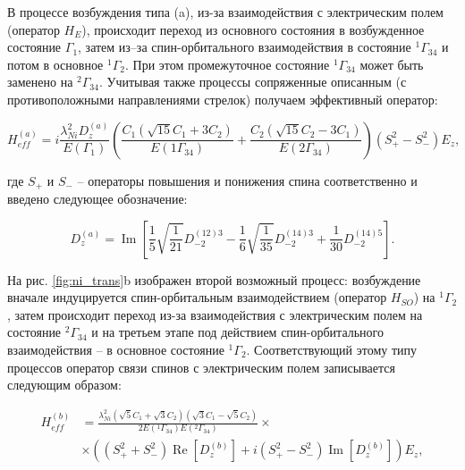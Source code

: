 В процессе возбуждения типа (a), из-за взаимодействия с электрическим полем (оператор $H_{E}$), происходит переход из основного состояния в возбужденное состояние $\Gamma_{1}$, затем из–за спин-орбитального взаимодействия в состояние $^{1}\Gamma_{34}$ и потом в основное $^{1}\Gamma_{2}$. При этом промежуточное состояние  $^{1}\Gamma_{34}$ может быть заменено на $^{2}\Gamma_{34}$. Учитывая также процессы сопряженные описанным (с противоположными направлениями стрелок) получаем эффективный оператор:

\begin{equation}
	\label{eq:NiHeffA}
	H_{eff}^{(a)}=i \frac{\lambda_{Ni}^{2} D_{z}^{(a)}}{E\left(\Gamma_{1}\right)}\left(\frac{C_{1}\left(\sqrt{15} C_{1}+3 C_{2}\right)}{E\left(1 \Gamma_{34}\right)}+\frac{C_{2}\left(\sqrt{15} C_{2}-3 C_{1}\right)}{E\left(2 \Gamma_{34}\right)}\right)\left(S_{+}^{2}-S_{-}^{2}\right) E_{z},
\end{equation}

где $S_{+}$ и $S_{-}$ – операторы повышения и понижения спина соответственно и введено следующее обозначение:

\begin{equation}
	\label{eq:NiDzA}
	D_{z}^{(a)}=\operatorname{Im}\left[\frac{1}{5} \sqrt{\frac{1}{21}} D_{-2}^{(12) 3}-\frac{1}{6} \sqrt{\frac{1}{35}} D_{-2}^{(14) 3}+\frac{1}{30} D_{-2}^{(14) 5}\right].
\end{equation}

На рис. \cref{fig:ni_trans}b изображен второй возможный процесс: возбуждение вначале индуцируется спин-орбитальным взаимодействием (оператор $H_{SO}$) на $^{1}\Gamma_{2}$, затем происходит переход из-за взаимодействия с электрическим полем на состояние $^{2}\Gamma_{34}$ и на третьем этапе под действием спин-орбитального взаимодействия – в основное состояние $^{1}\Gamma_{2}$. Соответствующий этому типу процессов оператор связи спинов с электрическим полем записывается следующим образом:

\begin{equation}
	\label{eq:NiHeffB}
	\begin{aligned}
		H_{eff}^{(b)} & =\frac{\lambda_{Ni}^{2}\left(\sqrt{5} C_{1}+\sqrt{3} 	C_{2}\right)\left(\sqrt{3} C_{1}-\sqrt{5} C_{2}\right)}{2 E\left({ }^{1} \Gamma_{34}\right) E\left({ }^{2} \Gamma_{34}\right)} \times \\
		& \times \left(\left(S_{+}^{2}+S_{-}^{2}\right) 	\operatorname{Re}\left[D_{z}^{(b)}\right]+i\left(S_{+}^{2}-S_{-}^{2}\right) \operatorname{Im}\left[D_{z}^{(b)}\right]\right) E_{z},
	\end{aligned}
\end{equation}

